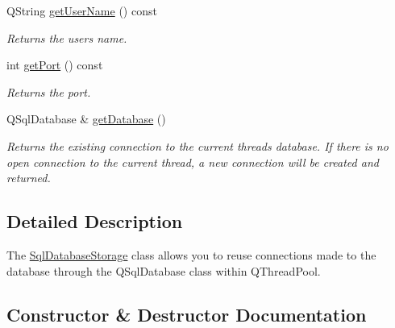 \begin{DoxyCompactItemize}
\mbox{\label{class_sql_database_storage_afc4b98c1eb06e868ce0b317aa381a899}} 
Q\+String \mbox{\hyperlink{class_sql_database_storage_afc4b98c1eb06e868ce0b317aa381a899}{get\+User\+Name}} () const
\begin{DoxyCompactList}\small\item\em Returns the user\textquotesingle{}s name. \end{DoxyCompactList}\item 
\mbox{\label{class_sql_database_storage_acf0079bd639d2e4ba91c9b007a6af263}} 
int \mbox{\hyperlink{class_sql_database_storage_acf0079bd639d2e4ba91c9b007a6af263}{get\+Port}} () const
\begin{DoxyCompactList}\small\item\em Returns the port. \end{DoxyCompactList}\item 
\mbox{\label{class_sql_database_storage_a4184a8138d1f65bc644825f587436aea}} 
Q\+Sql\+Database \& \mbox{\hyperlink{class_sql_database_storage_a4184a8138d1f65bc644825f587436aea}{get\+Database}} ()
\begin{DoxyCompactList}\small\item\em Returns the existing connection to the current thread\textquotesingle{}s database. If there is no open connection to the current thread, a new connection will be created and returned. \end{DoxyCompactList}\end{DoxyCompactItemize}


\subsection{Detailed Description}
The \mbox{\hyperlink{class_sql_database_storage}{Sql\+Database\+Storage}} class allows you to reuse connections made to the database through the Q\+Sql\+Database class within Q\+Thread\+Pool. 

\subsection{Constructor \& Destructor Documentation}
\mbox{\label{class_sql_database_storage_a691465c618b8050f5c67543f57fc4d15}} 
